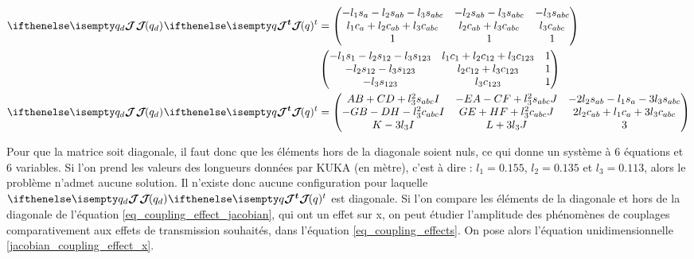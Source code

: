 \begin{appendices}
	\begin{equation} \label{eq_coupling_effect_jacobian}
	\begin{split}
	\jacobian{q_d}{}{} \jacobian{q}{}{t} &= 
	\begin{pmatrix}
	-l_1 s_a - l_2 s_{ab} - l_3 s_{abc} & -l_2 s_{ab} - l_3 s_{abc}  & -l_3 s_{abc} \\
	l_1 c_a + l_2 c_{ab} + l_3 c_{abc} & l_2 c_{ab} + l_3 c_{abc}  & l_3 c_{abc} \\
	1 & 1 & 1 \\
	\end{pmatrix} \\&
	\begin{pmatrix}
	-l_1 s_1 - l_2 s_{12} - l_3 s_{123} & l_1 c_1 + l_2 c_{12} + l_3 c_{123} & 1 \\
	-l_2 s_{12} - l_3 s_{123} & l_2 c_{12} + l_3 c_{123}  & 1 \\
	 -l_3 s_{123} & l_3 c_{123} & 1 \\
	\end{pmatrix}	\\
	\jacobian{q_d}{}{} \jacobian{q}{}{t} &= 
	\begin{pmatrix}
		A B + C D + l_3^2 s_{abc} I &
		-E A - C F + l_3^2 s_{abc} J &
		-2 l_2 s_{ab} - l_1 s_{a} - 3 l_3 s_{abc} \\
		-G B - D H - l_3^2 c_{abc} I &
		G E + H F + l_3^2 c_{abc} J &
		2 l_2 c_{ab} + l_1 c_{a} + 3 l_3 c_{abc} \\
		K - 3 l_3 I &
		L + 3 l_3 J &
		3 \\
	\end{pmatrix}
	\end{split}
	\end{equation}
	
	Pour que la matrice soit diagonale, il faut donc que les éléments hors de la diagonale soient nuls, ce qui donne un système à 6 équations et 6 variables. Si l'on prend les valeurs des longueurs données par KUKA (en mètre), c'est à dire : $ l_1 = 0.155$, $ l_2 = 0.135 $ et $ l_3 = 0.113 $, alors le problème n'admet aucune solution. Il n'existe donc aucune configuration pour laquelle $ \jacobian{q_d}{}{} \jacobian{q}{}{t} $ est diagonale. Si l'on compare les éléments de la diagonale et hors de la diagonale de l'équation \cref{eq_coupling_effect_jacobian}, qui ont un effet sur x, on peut étudier l'amplitude des phénomènes de couplages comparativement aux effets de transmission souhaités, dans l'équation \cref{eq_coupling_effects}. On pose alors l'équation unidimensionnelle \cref{jacobian_coupling_effect_x}.
	

\end{appendices}
